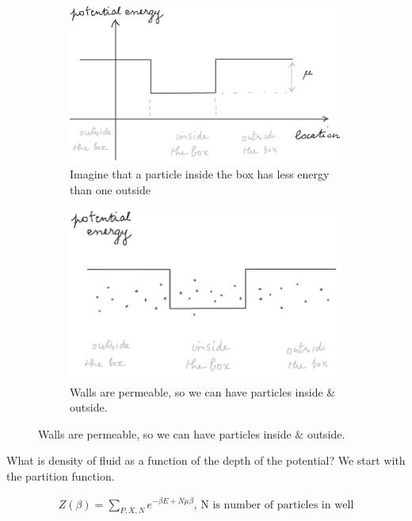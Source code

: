 \documentclass[]{article}
\begin{document}
\begin{figure}[H]
	\caption{Box of fluid}
	\begin{subfigure}[b]{0.45\textwidth}
		\center
		\caption{Imagine that a particle inside the box has less energy than one outside}\label{fig:box1}
		\includegraphics[width=\textwidth]{box1}
	\end{subfigure}
	\hfill
	\begin{subfigure}[b]{0.45\textwidth}
		\center
		\caption{Walls are permeable, so we can have particles inside \& outside.}\label{fig:box2}
		\includegraphics[width=\textwidth]{box2}
	\end{subfigure}
\end{figure}

What is density of fluid as a function of the depth of the potential? We start with the partition function.

\begin{align*}
	Z(\beta) = \sum_{P,X,N}e^{- \beta E + N \mu \beta} \text{, N is number of particles in well}
\end{align*}
\end{document}
